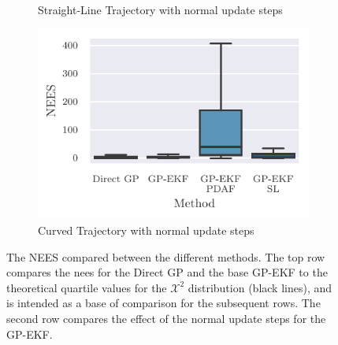 \begin{figure}
{\begin{subfigure}{0.6\textwidth}
            \caption{Straight-Line Trajectory with normal update steps}
            \label{fig:stats_straight_nees_update}
        \end{subfigure}
        \begin{subfigure}{0.6\textwidth}
            \includegraphics{figures/curved_line_stats/nees.pdf}
            \caption{Curved Trajectory with normal update steps}
            \label{fig:stats_curved_nees_update}
        \end{subfigure}
    }

    \caption{The NEES compared between the different methods. The top row compares the \acrshort{nees} for the Direct GP and the base GP-EKF to the theoretical quartile values for the $\mathcal{X}^2$ distribution (black lines), and is intended as a base of comparison for the subsequent rows. The second row compares the effect of the normal update steps for the GP-EKF.}

\end{figure}


